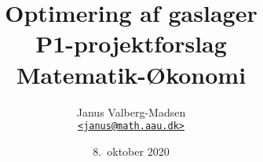\documentclass[12pt,a4paper,oneside,final]{article}
\title{
  Optimering af gaslager\\
  \large P1-projektforslag \\
  Matematik-{\O}konomi
}
\author{
  Janus Valberg-Madsen\\
  \href{mailto:janus@math.aau.dk}{\texttt{<janus@math.aau.dk>}}
}
\date{8.\ oktober 2020}
\begin{document}
\maketitle

\begin{center}
  
\end{center}

\tableofcontents








\end{document}
